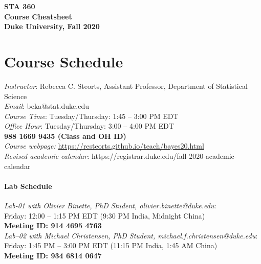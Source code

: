 \documentclass[11pt]{article}
\date{}
\begin{document}
\begin{center}
{\Large\bf STA 360\\ Course Cheatsheet} \\

{\Large\bf Duke University, Fall 2020} \\
\end{center}


\section{Course Schedule}
\emph{Instructor}: Rebecca C. Steorts,  Assistant Professor,  Department of Statistical Science\\
\emph{Email}: beka@stat.duke.edu\\
\emph{Course Time}: Tuesday/Thursday: 1:45 -- 3:00 PM EDT \\
\emph{Office Hour}: Tuesday/Thursday: 3:00 -- 4:00 PM EDT \\
\textbf{988 1669 9435 (Class and OH ID)}\\
\emph{Course webpage:} \url{https://resteorts.github.io/teach/bayes20.html} \\
\emph{Revised academic calendar:} https://registrar.duke.edu/fall-2020-academic-calendar


\paragraph{Lab Schedule}
\emph{Lab-01 with Olivier Binette, PhD Student, olivier.binette@duke.edu}: \\Friday: 12:00 -- 1:15 PM EDT (9:30 PM India, Midnight China)\\
\textbf{Meeting ID: 914 4695 4763}\\
\emph{Lab--02 with Michael Christensen, PhD Student, michael.f.christensen@duke.edu}: \\Friday: 1:45 PM -- 3:00 PM EDT (11:15 PM India, 1:45 AM China)\\
\textbf{Meeting ID: 934 6814 0647}
\end{document}
